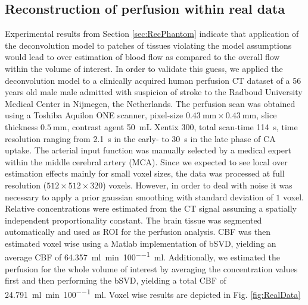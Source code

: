 \documentclass[journal,twocolumn]{IEEEtran}
\newcommand{\siPml}{\milli\litre\per\minute\per100\milli\litre}
\begin{document}
	
	\subsection{Reconstruction of perfusion within real data}\label{sec:RealData}
 	Experimental results from Section \ref{sec:RecPhantom} indicate that application of the deconvolution model to patches of tissues violating the model assumptions would lead to over estimation of blood flow as compared to the overall flow within the volume of interest.
	In order to validate this guess, we applied the deconvolution model to a clinically acquired human perfusion CT dataset of a 56 years old male male admitted with suspicion of stroke to the Radboud University Medical Center in Nijmegen, the Netherlands.
	The perfusion scan was obtained using a Toshiba Aquilon ONE scanner, pixel-size $\SI{0.43}{\milli\meter}\times\SI{0.43}{\milli\meter}$, slice thickness $\SI{0.5}{\milli\meter}$, contrast agent \SI{50}{\milli\liter} Xentix 300, total scan-time \SI{114}{\second}, time resolution ranging from \SI{2.1}{\second} in the early- to \SI{30}{\second} in the late phase of CA uptake.
	The arterial input function was manually selected by a medical expert within the middle cerebral artery (MCA).
	Since we expected to see local over estimation effects mainly for small voxel sizes, the data was processed at full resolution ($512\times512\times320$) voxels. 
	However, in order to deal with noise it was necessary to apply a prior gaussian smoothing with standard deviation of $1$ voxel.	
	Relative concentrations were estimated from the CT signal assuming a spatially independent proportionality constant. The brain tissue was segmented automatically and used as ROI for the perfusion analysis.
	CBF was then estimated voxel wise using a Matlab implementation of bSVD, yielding an average CBF of \SI{64.357}{\siPml}.
	Additionally, we estimated the perfusion for the whole volume of interest by averaging the concentration values first and then performing the bSVD, yielding a total CBF of \SI{24.791}{\siPml}.
	Voxel wise results are depicted in Fig. \ref{fig:RealData}
	
\end{document}

